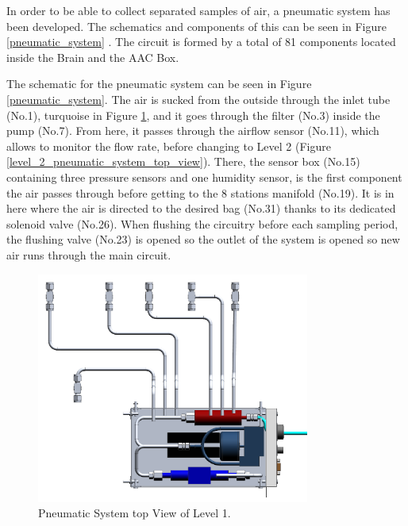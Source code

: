 In order to be able to collect separated samples of air, a pneumatic system has been developed. The schematics and components of this can be seen in Figure \ref{pneumatic_system} . The circuit is formed by a total of 81 components located inside the Brain and the AAC Box. 


The schematic for the pneumatic system can be seen in Figure \ref{pneumatic_system}. The air is sucked from the outside through the inlet tube (No.1), turquoise in Figure \ref{level_1_pneumatic_system_top_view}, and it goes through the filter (No.3) inside the pump (No.7). From here, it passes through the airflow sensor (No.11), which allows to monitor the flow rate, before changing to Level 2 (Figure \ref{level_2_pneumatic_system_top_view}). There, the sensor box (No.15) containing three pressure sensors and one humidity sensor, is the first component the air passes through before getting to the 8 stations manifold (No.19). It is in here where the air is directed to the desired bag (No.31) thanks to its dedicated solenoid valve (No.26). 
When flushing the circuitry before each sampling period, the flushing valve (No.23) is opened so the outlet of the system is opened so new air runs through the main circuit. 

\begin{figure}[H]
    \centering
    \includegraphics[width=0.8\textwidth]{4-experiment-design/img/Mechanical/Pneumatic_System_Top_View_Level_1.png}
    \caption{Pneumatic System top View of Level 1.}
    \label{level_1_pneumatic_system_top_view}
\end{figure}

